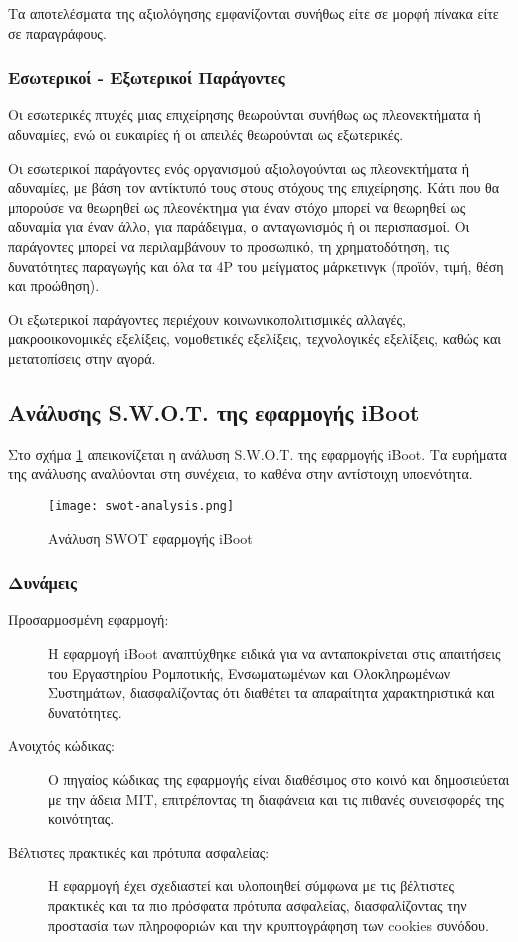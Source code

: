 Τα αποτελέσματα της αξιολόγησης εμφανίζονται συνήθως είτε σε μορφή πίνακα είτε σε παραγράφους.

\subsubsection{Εσωτερικοί - Εξωτερικοί Παράγοντες}
Οι εσωτερικές πτυχές μιας επιχείρησης θεωρούνται συνήθως ως πλεονεκτήματα ή αδυναμίες, ενώ οι ευκαιρίες ή οι απειλές θεωρούνται ως εξωτερικές.

Οι εσωτερικοί παράγοντες ενός οργανισμού αξιολογούνται ως πλεονεκτήματα ή αδυναμίες, με βάση τον αντίκτυπό τους στους στόχους της επιχείρησης. Κάτι που θα μπορούσε να θεωρηθεί ως πλεονέκτημα για έναν στόχο μπορεί να θεωρηθεί ως αδυναμία για έναν άλλο, για παράδειγμα, ο ανταγωνισμός ή οι περισπασμοί. Οι παράγοντες μπορεί να περιλαμβάνουν το προσωπικό, τη χρηματοδότηση, τις δυνατότητες παραγωγής και όλα τα 4P του μείγματος μάρκετινγκ (προϊόν, τιμή, θέση και προώθηση).

Οι εξωτερικοί παράγοντες περιέχουν κοινωνικοπολιτισμικές αλλαγές, μακροοικονομικές εξελίξεις, νομοθετικές εξελίξεις, τεχνολογικές εξελίξεις, καθώς και μετατοπίσεις στην αγορά.

\subsection{Ανάλυσης S.W.O.T. της εφαρμογής iBoot}
Στο σχήμα \ref{fig:iBoot_swot_analysis} απεικονίζεται η ανάλυση S.W.O.T. της εφαρμογής iBoot. Τα ευρήματα της ανάλυσης αναλύονται στη συνέχεια, το καθένα στην αντίστοιχη υποενότητα.

\begin{figure}[ht]
	\centering
	\texttt{[image: swot-analysis.png]}
	\caption{Ανάλυση SWOT εφαρμογής iBoot}
	\label{fig:iBoot_swot_analysis}
\end{figure}

\subsubsection{Δυνάμεις}
\begin{description}
	\item[Προσαρμοσμένη εφαρμογή:] Η εφαρμογή iBoot αναπτύχθηκε ειδικά για να ανταποκρίνεται στις απαιτήσεις του Εργαστηρίου Ρομποτικής, Ενσωματωμένων και Ολοκληρωμένων Συστημάτων, διασφαλίζοντας ότι διαθέτει τα απαραίτητα χαρακτηριστικά και δυνατότητες.
	\item[Ανοιχτός κώδικας:] Ο πηγαίος κώδικας της εφαρμογής είναι διαθέσιμος στο κοινό και δημοσιεύεται με την άδεια MIT, επιτρέποντας τη διαφάνεια και τις πιθανές συνεισφορές της κοινότητας.
	\item[Βέλτιστες πρακτικές και πρότυπα ασφαλείας:] Η εφαρμογή έχει σχεδιαστεί και υλοποιηθεί σύμφωνα με τις βέλτιστες πρακτικές και τα πιο πρόσφατα πρότυπα ασφαλείας, διασφαλίζοντας την προστασία των πληροφοριών και την κρυπτογράφηση των cookies συνόδου.
\end{description}

